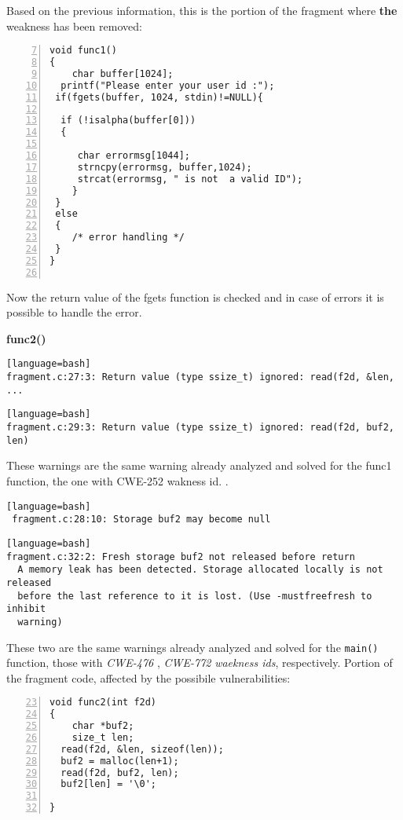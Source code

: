 \documentclass[a4paper,12pt]{article}
\begin{document}
\noindent
Based on the previous information, this is the portion of the fragment where \textbf{the} weakness has been removed:
\begin{lstlisting}[style=c,numbers=left,firstnumber=7,linebackgroundcolor={
\ifnum\value{lstnumber}=11\color{green}\fi}]
void func1()
{	
	char buffer[1024];
  printf("Please enter your user id :");
 if(fgets(buffer, 1024, stdin)!=NULL){
 
  if (!isalpha(buffer[0]))
  {

     char errormsg[1044];
     strncpy(errormsg, buffer,1024);
     strcat(errormsg, " is not  a valid ID");
 	}
 }
 else
 {
	/* error handling */ 
 }
}


\end{lstlisting}
Now the return value of the fgets function is checked and in case of errors it is possible to handle the error.


\noindent
\textbf{func2()}\\

\begin{lstlisting}[style=DOS][language=bash]
fragment.c:27:3: Return value (type ssize_t) ignored: read(f2d, &len, ...
\end{lstlisting}



\begin{lstlisting}[style=DOS][language=bash]
fragment.c:29:3: Return value (type ssize_t) ignored: read(f2d, buf2, len)

\end{lstlisting}
These warnings are the same warning already analyzed and solved for the func1 function, the one with CWE-252 wakness id. \cite{CWE252}.
\begin{lstlisting}[style=DOS][language=bash]
 fragment.c:28:10: Storage buf2 may become null
\end{lstlisting}

\begin{lstlisting}[style=DOS][language=bash]
fragment.c:32:2: Fresh storage buf2 not released before return
  A memory leak has been detected. Storage allocated locally is not released
  before the last reference to it is lost. (Use -mustfreefresh to inhibit
  warning)
\end{lstlisting}
These two are the same warnings already analyzed and solved for the \texttt{main()} function, those with \textit{CWE-476} \cite{CWE476}, \textit{CWE-772} \cite{CWE772} \textit{waekness ids}, respectively.
\noindent
Portion of the fragment code, affected by the possibile vulnerabilities:
\begin{lstlisting}[style=c,numbers=left,firstnumber=23,linebackgroundcolor={
\ifnum\value{lstnumber}=27\color{red}\fi
\ifnum\value{lstnumber}=29\color{red}\fi
\ifnum\value{lstnumber}=32\color{red}\fi
\ifnum\value{lstnumber}=28\color{red}\fi
}]
void func2(int f2d)
{
	char *buf2;
	size_t len;
  read(f2d, &len, sizeof(len));
  buf2 = malloc(len+1); 
  read(f2d, buf2, len); 
  buf2[len] = '\0';

}

\end{lstlisting}
\end{document}
